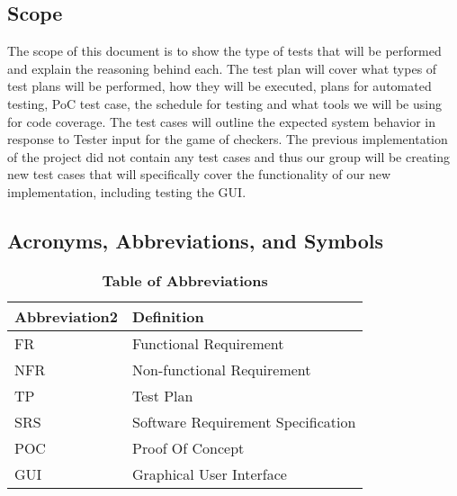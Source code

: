 \documentclass[12pt, titlepage]{article}
\begin{document}
\subsection{Scope}
The scope of this document is to show the type of tests that will be performed and explain the reasoning behind each. The test plan will cover what types of test plans will be performed, how they will be executed, plans for automated testing, PoC test case, the schedule for testing and what tools we will be using for code coverage. The test cases will outline the expected system behavior in response to Tester input for the game of checkers. The previous implementation of the project did not contain any test cases and thus our group will be creating new test cases that will specifically cover the functionality of our new implementation, including testing the GUI.

\subsection{Acronyms, Abbreviations, and Symbols}
\begin{table}[hbp]
\caption{\textbf{Table of Abbreviations}} \label{Table}

\begin{tabularx}{\textwidth}{p{3cm}X}
\toprule
\textbf{Abbreviation2} & \textbf{Definition} \\
\midrule
FR & Functional Requirement\\
NFR & Non-functional Requirement\\
TP & Test Plan\\
SRS & Software Requirement Specification\\
POC & Proof Of Concept\\
GUI & Graphical User Interface\\
\bottomrule
\end{tabularx}

\end{table}


\end{document}
